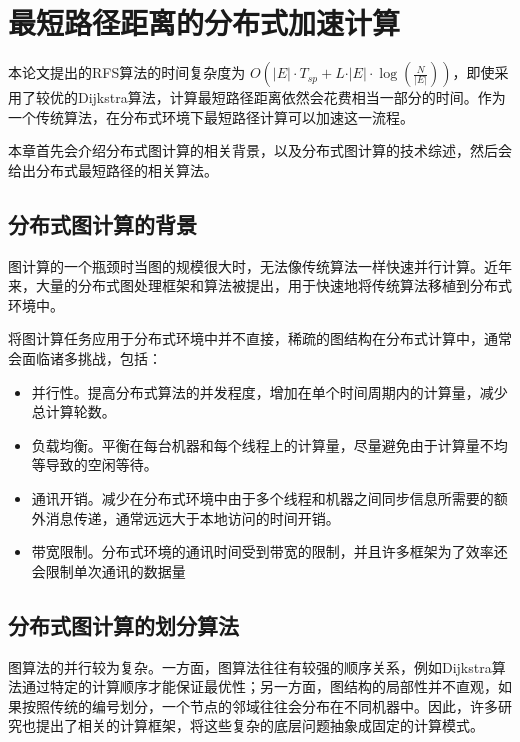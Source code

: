 \chapter{最短路径距离的分布式加速计算}
\label{sec:distribution1}

本论文提出的RFS算法的时间复杂度为 $O(\vert E \vert \cdot T_{sp} + L \cdot \vert E \vert \cdot \log(\frac{N}{\vert E \vert}))$，即使采用了较优的Dijkstra算法，计算最短路径距离依然会花费相当一部分的时间。作为一个传统算法，在分布式环境下最短路径计算可以加速这一流程。

本章首先会介绍分布式图计算的相关背景，以及分布式图计算的技术综述，然后会给出分布式最短路径的相关算法。

\section{分布式图计算的背景}
\label{sec:distribution_background}

图计算的一个瓶颈时当图的规模很大时，无法像传统算法一样快速并行计算。近年来，大量的分布式图处理框架和算法被提出，用于快速地将传统算法移植到分布式环境中。

将图计算任务应用于分布式环境中并不直接，稀疏的图结构在分布式计算中，通常会面临诸多挑战，包括：

\begin{itemize}
    \item 并行性。提高分布式算法的并发程度，增加在单个时间周期内的计算量，减少总计算轮数。
    \item 负载均衡。平衡在每台机器和每个线程上的计算量，尽量避免由于计算量不均等导致的空闲等待。
    \item 通讯开销。减少在分布式环境中由于多个线程和机器之间同步信息所需要的额外消息传递，通常远远大于本地访问的时间开销。
    \item 带宽限制。分布式环境的通讯时间受到带宽的限制，并且许多框架为了效率还会限制单次通讯的数据量
\end{itemize}

\section{分布式图计算的划分算法}
\label{sec:distribution_partition}

图算法的并行较为复杂。一方面，图算法往往有较强的顺序关系，例如Dijkstra算法通过特定的计算顺序才能保证最优性；另一方面，图结构的局部性并不直观，如果按照传统的编号划分，一个节点的邻域往往会分布在不同机器中。因此，许多研究也提出了相关的计算框架，将这些复杂的底层问题抽象成固定的计算模式。

